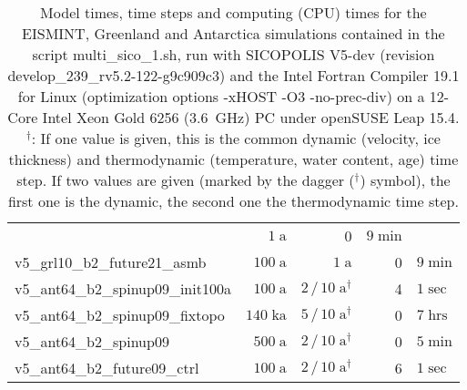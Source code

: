 \documentclass[12pt,a4paper]{article}
\begin{document}
\begin{appendix}
\begin{table}[ht]
\begin{tabular}{lrrr@{.}l}
                                     &    $1\;\mathrm{ a}$\hspace*{1.0em}
                                     &  0&$9\;\mathrm{min}$ \\
v5\_grl10\_b2\_future21\_asmb        &  $100\;\mathrm{ a}$\hspace*{1.47em}
                                     &    $1\;\mathrm{ a}$\hspace*{1.0em}
                                     &  0&$9\;\mathrm{min}$ \\ \hline
v5\_ant64\_b2\_spinup09\_init100a    &  $100\;\mathrm{ a}$\hspace*{1.47em}
                                     & $2\,/\,10\;\mathrm{ a}^{\dagger}$\hspace*{0.6em}
                                     &  4&$1\;\mathrm{sec}$ \\
v5\_ant64\_b2\_spinup09\_fixtopo     &  $140\;\mathrm{ka}$\hspace*{1.0em}
                                     &  $5\,/\,10\;\mathrm{ a}^{\dagger}$\hspace*{0.6em}
                                     &  0&$7\;\mathrm{hrs}$ \\
v5\_ant64\_b2\_spinup09              &  $500\;\mathrm{ a}$\hspace*{1.47em}
                                     & $2\,/\,10\;\mathrm{ a}^{\dagger}$\hspace*{0.6em}
                                     &  0&$5\;\mathrm{min}$ \\
v5\_ant64\_b2\_future09\_ctrl        &  $100\;\mathrm{ a}$\hspace*{1.47em}
                                     & $2\,/\,10\;\mathrm{ a}^{\dagger}$\hspace*{0.6em}
                                     &  6&$1\;\mathrm{sec}$ \\ \hline
\end{tabular}
\caption{Model times, time steps and computing (CPU) times for the EISMINT, Greenland and Antarctica simulations contained in the script multi\_sico\_1.sh, run with SICOPOLIS V5-dev (revision develop\_239\_rv5.2-122-g9c909c3) and the Intel Fortran Compiler 19.1 for Linux (optimization options -xHOST -O3 -no-prec-div) on a 12-Core Intel Xeon Gold 6256 (3.6~GHz) PC under openSUSE Leap 15.4.
\protect\\
{}$^\dagger$: If one value is given, this is the common dynamic (velocity, ice thickness) and thermodynamic (temperature, water content, age) time step. If two values are given (marked by the dagger ($^\dagger$) symbol), the first one is the dynamic, the second one the thermodynamic time step.
}
\end{table}
\end{appendix}
\end{document}
